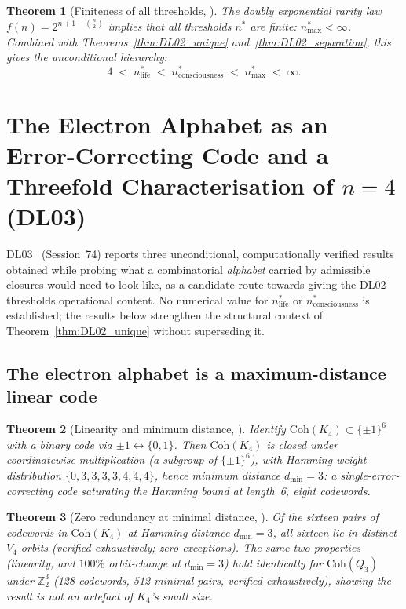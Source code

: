 \documentclass[11pt,a4paper]{article}
\theoremstyle{plain}
\newtheorem{theorem}{Theorem}[section]
\theoremstyle{definition}
\theoremstyle{remark}
\begin{document}
\begin{theorem}[Finiteness of all thresholds, \cite{DL02}]
\label{thm:DL02_finiteness}
The doubly exponential rarity law $f(n) = 2^{n+1-\binom{n}{2}}$ implies that all thresholds $n^*$ are finite: $n^*_{\mathrm{max}} < \infty$. Combined with Theorems~\ref{thm:DL02_unique} and~\ref{thm:DL02_separation}, this gives the unconditional hierarchy:
\begin{equation}
4 \;<\; n^*_{\mathrm{life}} \;<\; n^*_{\mathrm{consciousness}} \;<\; n^*_{\mathrm{max}} \;<\; \infty.
\end{equation}
\end{theorem}

\section{The Electron Alphabet as an Error-Correcting Code and a Threefold Characterisation of \texorpdfstring{$n=4$}{n=4} (DL03)}
\label{sec:DL03}

DL03~\cite{DL03} (Session~74) reports three unconditional, computationally verified results obtained while probing what a combinatorial \emph{alphabet} carried by admissible closures would need to look like, as a candidate route towards giving the DL02 thresholds operational content. No numerical value for $n^*_{\mathrm{life}}$ or $n^*_{\mathrm{consciousness}}$ is established; the results below strengthen the structural context of Theorem~\ref{thm:DL02_unique} without superseding it.

\subsection{The electron alphabet is a maximum-distance linear code}

\begin{theorem}[Linearity and minimum distance, \cite{DL03}]
\label{thm:DL03_code}
Identify $\mathrm{Coh}(K_4)\subset\{\pm1\}^6$ with a binary code via $\pm1\leftrightarrow\{0,1\}$. Then $\mathrm{Coh}(K_4)$ is closed under coordinatewise multiplication (a subgroup of $\{\pm1\}^6$), with Hamming weight distribution $\{0,3,3,3,3,4,4,4\}$, hence minimum distance $d_{\min}=3$: a single-error-correcting code saturating the Hamming bound at length~6, eight codewords.
\end{theorem}

\begin{theorem}[Zero redundancy at minimal distance, \cite{DL03}]
\label{thm:DL03_phonemic}
Of the sixteen pairs of codewords in $\mathrm{Coh}(K_4)$ at Hamming distance $d_{\min}=3$, all sixteen lie in distinct $V_4$-orbits (verified exhaustively; zero exceptions). The same two properties (linearity, and $100\%$ orbit-change at $d_{\min}=3$) hold identically for $\mathrm{Coh}(Q_3)$ under $\mathbb{Z}_2^3$ (128 codewords, 512 minimal pairs, verified exhaustively), showing the result is not an artefact of $K_4$'s small size.
\end{theorem}
\end{document}
